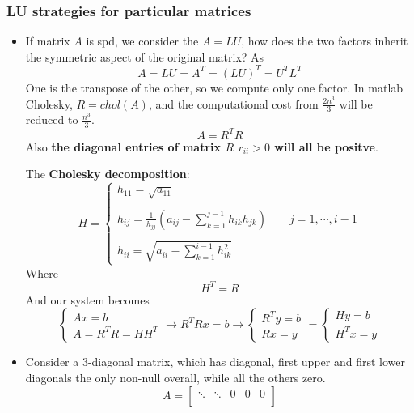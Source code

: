 \subsubsection{LU strategies for particular matrices}
    \begin{itemize}
        \item If matrix $A$ is spd, we consider the $A=LU$, how does the two factors inherit the symmetric aspect of the original matrix? As
        $$A=LU=A^T=(LU)^T=U^TL^T$$
        One is the transpose of the other, so we compute only one factor. In matlab Cholesky, $R=chol(A)$, and the computational cost from $\frac{2n^3}{3}$ will be reduced to $\frac{n^3}{3}$.
        $$
        A=R^TR
        $$
        Also \textbf{the diagonal entries of matrix $R$ $r_{ii}>0$ will all be positve}.

        The \textbf{Cholesky decomposition}:
        $$
        H=
        \begin{cases}
            h_{11}=\sqrt{a_{11}}\\
            \\
            h_{ij}=\frac{1}{h_{jj}}\left(
                a_{ij}-\sum_{k=1}^{j-1}h_{ik}h_{jk}
            \right)\qquad j=1,\cdots,i-1\\
            \\
            h_{ii}=\sqrt{
                a_{ii}-\sum_{k=1}^{i-1}h_{ik}^2
            }
        \end{cases}
        $$
        Where
        $$H^T=R$$
        And our system becomes
        $$
        \begin{cases}
            Ax =b\\
            A=R^TR=HH^T
        \end{cases}
        \rightarrow
        R^TRx=b
        \rightarrow
        \begin{cases}
            R^Ty=b\\
            Rx=y
        \end{cases}
        =
        \begin{cases}
            Hy=b\\
            H^Tx=y
        \end{cases}
        $$
        \item Consider a 3-diagonal matrix, which has diagonal, first upper and first lower diagonals the only non-null overall, while all the others zero.
        $$
        A=\begin{bmatrix}
            \ddots & \ddots & 0 & 0 & 0\\

\end{bmatrix}$$
\end{itemize}
